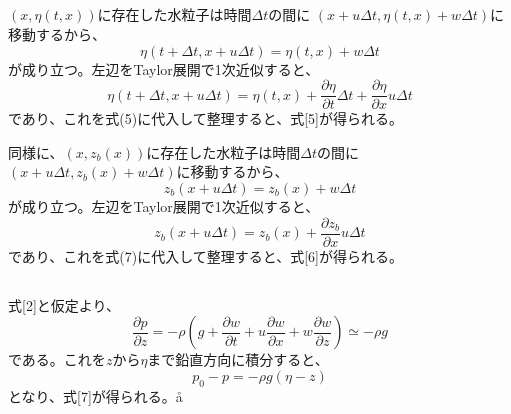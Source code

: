 \documentclass[a4paper]{jsarticle}
\begin{document}
\subsection{}
$(x, \eta(t, x))$に存在した水粒子は時間$\Delta t$の間に
$(x + u \Delta t, \eta(t, x) + w \Delta t)$に移動するから、
\begin{equation}
  \eta(t + \Delta t, x + u \Delta t) = \eta(t, x) + w \Delta t
\end{equation}
が成り立つ。左辺をTaylor展開で1次近似すると、
\begin{equation}
  \eta(t + \Delta t, x + u \Delta t)
  = \eta(t, x) + \frac{\partial \eta}{\partial t} \Delta t
  + \frac{\partial \eta}{\partial x} u \Delta t
\end{equation}
であり、これを式(5)に代入して整理すると、式[5]が得られる。\par
同様に、$(x, z_b(x))$に存在した水粒子は時間$\Delta t$の間に
$(x + u \Delta t, z_b(x) + w \Delta t)$に移動するから、
\begin{equation}
  z_b(x + u \Delta t) = z_b(x) + w \Delta t
\end{equation}
が成り立つ。左辺をTaylor展開で1次近似すると、
\begin{equation}
  z_b(x + u \Delta t)
  = z_b(x) + \frac{\partial z_b}{\partial x} u \Delta t
\end{equation}
であり、これを式(7)に代入して整理すると、式[6]が得られる。

\subsection{}
式[2]と仮定より、
\begin{equation}
  \frac{\partial p}{\partial z}
  = -\rho \left(g + \frac{\partial w}{\partial t}
  + u \frac{\partial w}{\partial x} + w \frac{\partial w}{\partial z}\right)
  \simeq -\rho g
\end{equation}
である。これを$z$から$\eta$まで鉛直方向に積分すると、
\begin{equation}
  p_0 - p = -\rho g (\eta - z)
\end{equation}
となり、式[7]が得られる。å

\subsection{}
\end{document}
